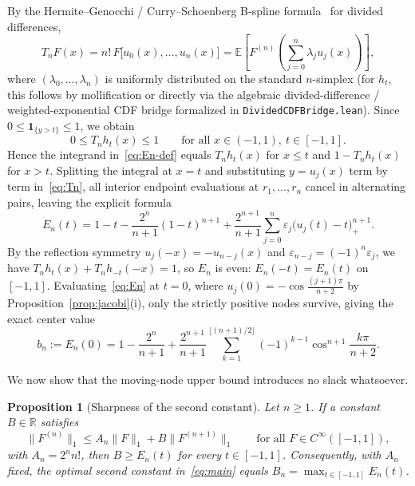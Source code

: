 \documentclass[11pt,a4paper]{article}
\newcommand{\R}{\mathbb{R}}
\newcommand{\E}{\mathbb{E}}
\newcommand{\Lone}[1]{\lVert #1\rVert_1}
\newcommand{\code}[1]{\nolinkurl{#1}}
\newtheorem{proposition}{Proposition}[section]
\theoremstyle{remark}
\numberwithin{equation}{section}
\begin{document}
By the Hermite--Genocchi / Curry--Schoenberg B-spline formula~\cite{CurrySchoenberg1966} for divided differences,
\[
    T_n F(x)
    = n!\, F\bigl[u_0(x), \dots, u_n(x)\bigr]
    = \E\!\left[F^{(n)}\!\left(\sum_{j=0}^{n}\lambda_j u_j(x)\right)\right],
\]
where $(\lambda_0, \dots, \lambda_n)$ is uniformly distributed on the standard $n$-simplex (for $h_t$, this follows by mollification or directly via the algebraic divided-difference / weighted-exponential CDF bridge formalized in \code{DividedCDFBridge.lean}). Since $0 \le \mathbf{1}_{\{y > t\}} \le 1$, we obtain
\begin{equation}
    0 \le T_n h_t(x) \le 1 \qquad \text{for all } x \in (-1,1),\ t \in [-1,1].
    \label{eq:Tn-ht-bounds}
\end{equation}
Hence the integrand in~\eqref{eq:En-def} equals $T_n h_t(x)$ for $x \le t$ and $1 - T_n h_t(x)$ for $x > t$. Splitting the integral at $x = t$ and substituting $y = u_j(x)$ term by term in~\eqref{eq:Tn}, all interior endpoint evaluations at $r_1, \dots, r_n$ cancel in alternating pairs, leaving the explicit formula
\begin{equation}
    E_n(t)
    = 1 - t - \frac{2^n}{n+1}(1 - t)^{n+1}
      + \frac{2^{n+1}}{n+1}\sum_{j=0}^{n} \varepsilon_j \bigl(u_j(t) - t\bigr)_+^{n+1}.
    \label{eq:En}
\end{equation}
By the reflection symmetry $u_j(-x) = -u_{n-j}(x)$ and $\varepsilon_{n-j} = (-1)^n \varepsilon_j$, we have $T_n h_t(x) + T_n h_{-t}(-x) = 1$, so $E_n$ is even: $E_n(-t) = E_n(t)$ on $[-1,1]$. Evaluating~\eqref{eq:En} at $t = 0$, where $u_j(0) = -\cos\frac{(j+1)\pi}{n+2}$ by Proposition~\ref{prop:jacobi}(i), only the strictly positive nodes survive, giving the exact center value
\begin{equation}
    b_n := E_n(0)
    = 1 - \frac{2^n}{n+1}
      + \frac{2^{n+1}}{n+1}\sum_{k=1}^{\lfloor(n+1)/2\rfloor}(-1)^{k-1}\cos^{n+1}\frac{k\pi}{n+2}.
    \label{eq:bn}
\end{equation}

We now show that the moving-node upper bound introduces no slack whatsoever.

\begin{proposition}[Sharpness of the second constant]
    \label{prop:sharp}
    Let $n \ge 1$. If a constant $B \in \R$ satisfies
    \[
        \Lone{F^{(n)}} \le A_n\Lone{F} + B\Lone{F^{(n+1)}}
        \qquad \text{for all } F \in C^\infty([-1,1]),
    \]
    with $A_n = 2^n n!$, then $B \ge E_n(t)$ for every $t \in [-1,1]$. Consequently, with $A_n$ fixed, the optimal second constant in~\eqref{eq:main} equals $B_n = \max_{t \in [-1,1]} E_n(t)$.
\end{proposition}
\end{document}

